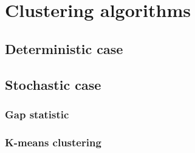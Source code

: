 
\section{Clustering algorithms}

\subsection{Deterministic case}
\subsection{Stochastic case}
\subsubsection{Gap statistic}

\subsubsection{K-means clustering}


